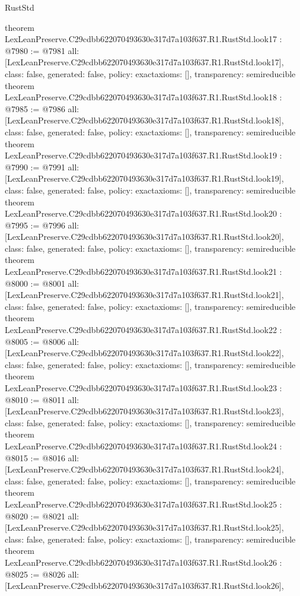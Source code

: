 \begin{lexlean}{RustStd}
\begin{coremodule}
theorem LexLeanPreserve.C29cdbb622070493630e317d7a103f637.R1.RustStd.look17 : @7980 := @7981 {
  all: [LexLeanPreserve.C29cdbb622070493630e317d7a103f637.R1.RustStd.look17],
  class: false,
  generated: false,
  policy: exact{axioms: []},
  transparency: semireducible
}
theorem LexLeanPreserve.C29cdbb622070493630e317d7a103f637.R1.RustStd.look18 : @7985 := @7986 {
  all: [LexLeanPreserve.C29cdbb622070493630e317d7a103f637.R1.RustStd.look18],
  class: false,
  generated: false,
  policy: exact{axioms: []},
  transparency: semireducible
}
theorem LexLeanPreserve.C29cdbb622070493630e317d7a103f637.R1.RustStd.look19 : @7990 := @7991 {
  all: [LexLeanPreserve.C29cdbb622070493630e317d7a103f637.R1.RustStd.look19],
  class: false,
  generated: false,
  policy: exact{axioms: []},
  transparency: semireducible
}
theorem LexLeanPreserve.C29cdbb622070493630e317d7a103f637.R1.RustStd.look20 : @7995 := @7996 {
  all: [LexLeanPreserve.C29cdbb622070493630e317d7a103f637.R1.RustStd.look20],
  class: false,
  generated: false,
  policy: exact{axioms: []},
  transparency: semireducible
}
theorem LexLeanPreserve.C29cdbb622070493630e317d7a103f637.R1.RustStd.look21 : @8000 := @8001 {
  all: [LexLeanPreserve.C29cdbb622070493630e317d7a103f637.R1.RustStd.look21],
  class: false,
  generated: false,
  policy: exact{axioms: []},
  transparency: semireducible
}
theorem LexLeanPreserve.C29cdbb622070493630e317d7a103f637.R1.RustStd.look22 : @8005 := @8006 {
  all: [LexLeanPreserve.C29cdbb622070493630e317d7a103f637.R1.RustStd.look22],
  class: false,
  generated: false,
  policy: exact{axioms: []},
  transparency: semireducible
}
theorem LexLeanPreserve.C29cdbb622070493630e317d7a103f637.R1.RustStd.look23 : @8010 := @8011 {
  all: [LexLeanPreserve.C29cdbb622070493630e317d7a103f637.R1.RustStd.look23],
  class: false,
  generated: false,
  policy: exact{axioms: []},
  transparency: semireducible
}
theorem LexLeanPreserve.C29cdbb622070493630e317d7a103f637.R1.RustStd.look24 : @8015 := @8016 {
  all: [LexLeanPreserve.C29cdbb622070493630e317d7a103f637.R1.RustStd.look24],
  class: false,
  generated: false,
  policy: exact{axioms: []},
  transparency: semireducible
}
theorem LexLeanPreserve.C29cdbb622070493630e317d7a103f637.R1.RustStd.look25 : @8020 := @8021 {
  all: [LexLeanPreserve.C29cdbb622070493630e317d7a103f637.R1.RustStd.look25],
  class: false,
  generated: false,
  policy: exact{axioms: []},
  transparency: semireducible
}
theorem LexLeanPreserve.C29cdbb622070493630e317d7a103f637.R1.RustStd.look26 : @8025 := @8026 {
  all: [LexLeanPreserve.C29cdbb622070493630e317d7a103f637.R1.RustStd.look26],
}
\end{coremodule}
\end{lexlean}
